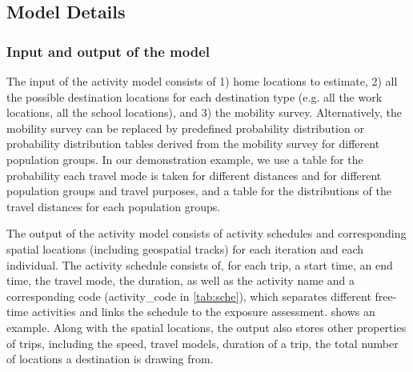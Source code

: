 \documentclass[]{article}
\begin{document}
\subsection{Model Details}
\subsubsection{Input and output of the model}

The input of the activity model consists of 1) home locations to estimate, 2) all the possible destination locations for each destination type (e.g. all the work locations, all the school locations), and 3) the mobility survey. Alternatively, the mobility survey can be replaced by predefined probability distribution or probability distribution tables derived from the mobility survey for different population groups. In our demonstration example, we use a table for the probability each travel mode is taken for different distances and for different population groups and travel purposes, and a table for the distributions of the travel distances for each population groups.
 

The output of the activity model consists of activity schedules and corresponding spatial locations (including geospatial tracks) for each iteration and each individual. The activity schedule consists of, for each trip, a start time, an end time, the travel mode, the duration, as well as the activity name and a corresponding code (activity\_code in \cref{tab:sche}), which separates different free-time activities and links the schedule to the exposure assessment.  shows an example. Along with the spatial locations, the output also stores other properties of trips, including the speed, travel models, duration of a trip, the total number of locations a destination is drawing from.
\end{document}
